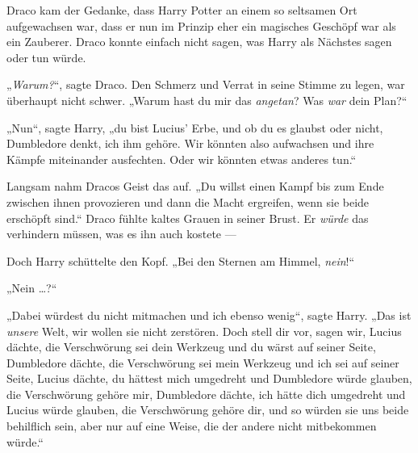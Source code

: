 Draco kam der Gedanke, dass Harry Potter an einem so seltsamen Ort aufgewachsen war, dass er nun im Prinzip eher ein magisches Geschöpf war als ein Zauberer. Draco konnte einfach nicht sagen, was Harry als Nächstes sagen oder tun würde.

„\emph{Warum?}“, sagte Draco. Den Schmerz und Verrat in seine Stimme zu legen, war überhaupt nicht schwer.
„Warum hast du mir das \emph{angetan}? Was \emph{war} dein Plan?“

„Nun“, sagte Harry, „du bist Lucius’ Erbe, und ob du es glaubst oder nicht, Dumbledore denkt, ich ihm gehöre. Wir könnten also aufwachsen und ihre Kämpfe miteinander ausfechten. Oder wir könnten etwas anderes tun.“

Langsam nahm Dracos Geist das auf.
„Du willst einen Kampf bis zum Ende zwischen ihnen provozieren und dann die Macht ergreifen, wenn sie beide erschöpft sind.“ Draco fühlte kaltes Grauen in seiner Brust. Er \emph{würde} das verhindern müssen, was es ihn auch kostete —

Doch Harry schüttelte den Kopf.
„Bei den Sternen am Himmel, \emph{nein}!“

„Nein …?“

„Dabei würdest du nicht mitmachen und ich ebenso wenig“, sagte Harry.
„Das ist \emph{unsere} Welt, wir wollen sie nicht zerstören. Doch stell dir vor, sagen wir, Lucius dächte, die Verschwörung sei dein Werkzeug und du wärst auf seiner Seite, Dumbledore dächte, die Verschwörung sei mein Werkzeug und ich sei auf seiner Seite, Lucius dächte, du hättest mich umgedreht und Dumbledore würde glauben, die Verschwörung gehöre mir, Dumbledore dächte, ich hätte dich umgedreht und Lucius würde glauben, die Verschwörung gehöre dir, und so würden sie uns beide behilflich sein, aber nur auf eine Weise, die der andere nicht mitbekommen würde.“

